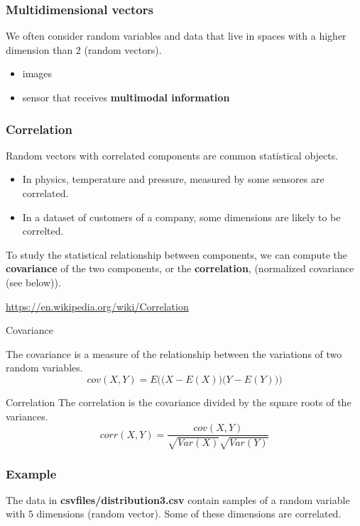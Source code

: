 \documentclass[usenames,dvipsnames,french]{beamer}
\begin{document}
\begin{frame}
\frametitle{Multidimensional vectors}
    We often consider random variables and data that live in spaces with a
    higher dimension than 2 (random vectors).
\begin{itemize}
	\item images
	\item sensor that receives \textbf{multimodal information}
\end{itemize}
\end{frame}


\begin{frame}
\frametitle{Correlation}

Random vectors with correlated components are common statistical objects.
\begin{itemize}
    \item In physics, temperature and pressure, measured by some sensores are
        correlated.
    \item In a dataset of customers of a company, some dimensions are likely to
        be correlted.
\end{itemize}

    To study the statistical relationship between components, we can compute
    the \textbf{covariance} of the two components, or the \textbf{correlation}, (normalized covariance (see below)).

    \url{https://en.wikipedia.org/wiki/Correlation} 
\end{frame}



\begin{frame}{Covariance}

    The covariance is a measure of the relationship between the variations of two random variables.
   \begin{equation}
       cov(X,Y)= E\Big( \big(X-E(X))(Y-E(Y)\big)  \Big)
   \end{equation}
\end{frame}

\begin{frame}{Correlation}
    The correlation is the covariance divided by the square roots of the variances.
   \begin{equation}
       corr(X,Y)= \frac{cov(X,Y)}{ \sqrt{Var(X)} \sqrt{Var(Y)}} 
   \end{equation}

\end{frame}

\begin{frame}
\frametitle{Example}
The data in \textbf{csv\textunderscore files/distribution\textunderscore 3.csv}
    contain samples of a random variable with $5$ dimensions (random vector). Some of these dimensions are correlated.

\end{frame}
\end{document}
